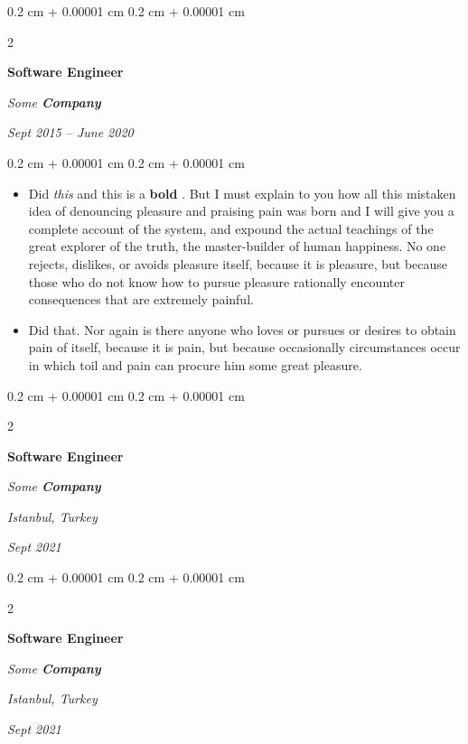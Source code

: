 \documentclass[10pt, letterpaper]{article}
\newenvironment{highlights}{
    \begin{itemize}[
        topsep=0.10 cm,
        parsep=0.10 cm,
        partopsep=0pt,
        itemsep=0pt,
        leftmargin=0.4 cm + 10pt
    ]
}{
    \end{itemize}
} %
\newenvironment{onecolentry}{
    \begin{adjustwidth}{
        0.2 cm + 0.00001 cm
    }{
        0.2 cm + 0.00001 cm
    }
}{
    \end{adjustwidth}
} %
\newenvironment{twocolentry}[2][]{
    \onecolentry
    \def\secondColumn{#2}
    \setcolumnwidth{\fill, 4.5 cm}
    \begin{paracol}{2}
}{
    \switchcolumn \raggedleft \secondColumn
    \end{paracol}
    \endonecolentry
} %
\let\hrefWithoutArrow\href
\renewcommand{\href}[2]{\hrefWithoutArrow{#1}{\ifthenelse{\equal{#2}{}}{ }{#2 }\raisebox{.15ex}{\footnotesize \faExternalLink*}}}
\begin{document}
        \vspace{0.2 cm}

        \begin{twocolentry}{
            
            
        \textit{Sept 2015 – June 2020}}
            \textbf{Software Engineer}
            
            \textit{Some \textbf{Company}}
        \end{twocolentry}

        \vspace{0.10 cm}
        \begin{onecolentry}
            \begin{highlights}
                \item Did \textit{this} and this is a \textbf{bold} \href{https://example.com}{link}. But I must explain to you how all this mistaken idea of denouncing pleasure and praising pain was born and I will give you a complete account of the system, and expound the actual teachings of the great explorer of the truth, the master-builder of human happiness. No one rejects, dislikes, or avoids pleasure itself, because it is pleasure, but because those who do not know how to pursue pleasure rationally encounter consequences that are extremely painful.
                \item Did that. Nor again is there anyone who loves or pursues or desires to obtain pain of itself, because it is pain, but because occasionally circumstances occur in which toil and pain can procure him some great pleasure.
            \end{highlights}
        \end{onecolentry}


        \vspace{0.2 cm}

        \begin{twocolentry}{
        \textit{Istanbul, Turkey}    
            
        \textit{Sept 2021}}
            \textbf{Software Engineer}
            
            \textit{Some \textbf{Company}}
        \end{twocolentry}



        \vspace{0.2 cm}

        \begin{twocolentry}{
        \textit{Istanbul, Turkey}    
            
        \textit{Sept 2021}}
            \textbf{Software Engineer}
            
            \textit{Some \textbf{Company}}
        \end{twocolentry}
\end{document}
